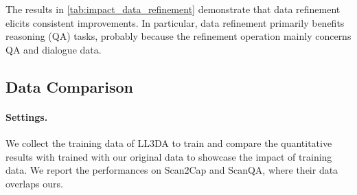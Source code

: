 \begin{table}[t!]
\centering
{}
\label{tab:impact_data_refinement}
\end{table}

The results in \cref{tab:impact_data_refinement} demonstrate that data refinement elicits consistent improvements. In particular, data refinement primarily benefits reasoning (QA) tasks, probably because the refinement operation mainly concerns QA and dialogue data.

\subsection{Data Comparison}\label{sec:data_comparison}
\paragraph{Settings.} We collect the training data of LL3DA \citep{chen2024ll3da} to train \agent and compare the quantitative results with \agent trained with our original data to showcase the impact of training data. We report the performances on Scan2Cap and ScanQA, where their data overlaps ours.

